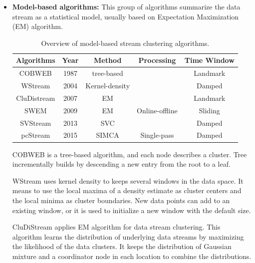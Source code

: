 \documentclass[../UNBThesis2.tex]{subfiles}
\begin{document}
\begin{itemize}
\item\textbf{Model-based algorithms:}
This group of algorithms summarize the data stream as a statistical model, usually based on Expectation Maximization (EM) algorithm. 

\begin{table}[h]
    \centering
    \caption{Overview of model-based stream clustering algorithms. }
    \label{modealgo}
    \small
    \begin{tabular}{c c c c c}
    \hline
      \textbf{Algorithms} & \textbf{Year} & \textbf{ Method } & \textbf{Processing} & \textbf{ Time Window}  \\
     \hline \midrule

      COBWEB             &    1987        &   tree-based          &          & Landmark \\
     \hline
     WStream             &    2004        &   Kernel-density          &                     & Damped \\
      \hline
      CluDistream        &     2007       &   EM      &        &  Landmark \\
    \hline 
      SWEM               &    2009        &  EM         &  Online-offline      & Sliding\\
    \hline 
      SVStream          &    2013        &    SVC       &                     & Damped  \\
    \hline 
      pcStream          &    2015        &       SIMCA      &          Single-pass           & Damped  \\
\bottomrule
    \end{tabular}
\end{table}


COBWEB \cite{fisher1987knowledge} is a tree-based algorithm, and each node describes a cluster. Tree incrementally builds by descending a new entry from the root to a leaf. 

WStream \cite{tasoulis2006unsupervised} uses kernel density to keeps several windows in the data space. It means to use the local maxima of a density estimate as cluster centers and the local minima as cluster boundaries. New data points can add to an existing window, or it is used to initialize a new window with the default size. 

CluDiStream \cite{zhou2007distributed} applies EM algorithm for data stream clustering. This algorithm learns the distribution of underlying data streams by maximizing the likelihood of the data clusters. It keeps the distribution of Gaussian mixture and a coordinator node in each location to combine the distributions.


\end{itemize}
\end{document}

